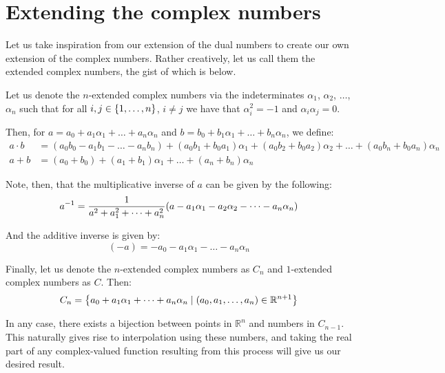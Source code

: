 \section{Extending the complex numbers}
Let us take inspiration from our extension of the dual numbers to create our own extension of the complex numbers. Rather creatively, let us call them the extended complex numbers, the gist of which is below.

Let us denote the $n$-extended complex numbers via the indeterminates $\alpha_1$, $\alpha_2$, $\dots$, $\alpha_n$ such that for all $i,j\in\br{1,\dots,n}$, $i\neq j$ we have that $\alpha_i^2=-1$ and $\alpha_i\alpha_j=0$.

Then, for $a=a_0+a_1\alpha_1+\dots+a_n\alpha_n$ and $b=b_0+b_1\alpha_1+\dots+b_n\alpha_n$, we define:
\begin{align*}
    a\cdot b &= (a_0b_0-a_1b_1-\dots-a_nb_n)+(a_0b_1+b_0a_1)\alpha_1+(a_0b_2+b_0a_2)\alpha_2+\dots+(a_0b_n+b_0a_n)\alpha_n \\
    a+b &= (a_0+b_0)+(a_1+b_1)\alpha_1+\dots+(a_n+b_n)\alpha_n
\end{align*}

Note, then, that the multiplicative inverse of $a$ can be given by the following:
$$
    a^{-1}=\frac{1}{a^2+a_1^2+\dots+a_n^2}\paren{a-a_1\alpha_1-a_2\alpha_2-\dots-a_n\alpha_n}
$$

And the additive inverse is given by:
$$
    (-a) = -a_0 - a_1\alpha_1 - \dots - a_n\alpha_n
$$

Finally, let us denote the $n$-extended complex numbers as $C_n$ and $1$-extended complex numbers as $C$. Then:
$$
    C_n = \br*{ a_0+a_1\alpha_1+\dots+a_n\alpha_n\mid (a_0,a_1,\dots,a_n)\in\mathbb{R}^{n+1} }
$$

In any case, there exists a bijection between points in $\mathbb{R}^n$ and numbers in $C_{n-1}$. This naturally gives rise to interpolation using these numbers, and taking the real part of any complex-valued function resulting from this process will give us our desired result.

